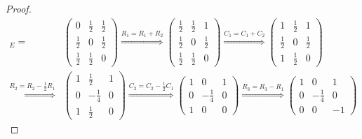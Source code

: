 \documentclass{article}
\begin{document}
    \begin{proof}
        \begin{align*}
            [q_2]_E =
            &\begin{pmatrix}
                0           & \frac{1}{2}   & \frac{1}{2} \\
                \frac{1}{2} & 0             & \frac{1}{2} \\
                \frac{1}{2} & \frac{1}{2}   & 0
            \end{pmatrix}
            \overset{R_1 = R_1 + R_2}\Rightarrow
            \begin{pmatrix}
                \frac{1}{2} & \frac{1}{2}   & 1 \\
                \frac{1}{2} & 0             & \frac{1}{2} \\
                \frac{1}{2} & \frac{1}{2}   & 0
            \end{pmatrix}
            \overset{C_1 = C_1 + C_2}\Rightarrow
            \begin{pmatrix}
                1           & \frac{1}{2}   & 1 \\
                \frac{1}{2} & 0             & \frac{1}{2} \\
                1           & \frac{1}{2}   & 0
            \end{pmatrix} \\
            \overset{R_2 = R_2 - \frac{1}{2}R_1}\Rightarrow
            &\begin{pmatrix}
                1           & \frac{1}{2}   & 1 \\
                0           & -\frac{1}{4}  & 0 \\
                1           & \frac{1}{2}   & 0
            \end{pmatrix}
            \overset{C_2 = C_2 - \frac{1}{2}C_1}\Rightarrow
            \begin{pmatrix}
                1           & 0             & 1 \\
                0           & -\frac{1}{4}  & 0 \\
                1           & 0             & 0
            \end{pmatrix}
            \overset{R_3 = R_3 - R_1}\Rightarrow
            \begin{pmatrix}
                1           & 0             & 1 \\
                0           & -\frac{1}{4}  & 0 \\
                0           & 0             & -1

\end{pmatrix}
\end{align*}
\end{proof}
\end{document}
